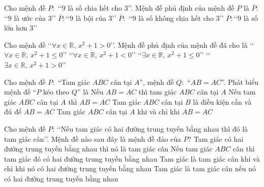 \begin{ex}%
	Cho mệnh đề $P\colon$ \lq\lq   $9$ là số chia hết cho $3$\rq\rq. Mệnh đề phủ định của mệnh đề $P$ là
	\choice
	{$\overline{P}\colon$\lq\lq   $9$ là ước của $3$\rq\rq}
	{$\overline{P}\colon$\lq\lq   $9$ là bội của $3$\rq\rq}
	{\True $\overline{P}\colon$ \lq\lq   $9$ là số không chia hết cho $3$\rq\rq}
	{$\overline{P}\colon$\lq\lq   $9$ là số lớn hơn $3$\rq\rq}
\end{ex}
\begin{ex}%
	Cho mệnh đề \lq\lq $\forall x\in \mathbb{R},\, x^2+1>0$\rq \rq. Mệnh đề phủ định của mệnh đề đã cho là
	\choice
	{\lq\lq $\forall x\in \mathbb{R},\, x^2+1\leq 0$\rq \rq}
	{\lq\lq $\forall x\in \mathbb{R},\, x^2+1<0$\rq \rq}
	{\True \lq\lq $\exists x\in \mathbb{R},\, x^2+1\leq 0$\rq \rq}
	{\lq\lq $\exists x\in \mathbb{R},\, x^2+1>0$\rq \rq}
\end{ex}
\begin{ex}%
	Cho mệnh đề $P\colon$ ``Tam giác $ABC$ cân tại $A$'', mệnh đề $Q\colon$ ``$AB=AC$''. Phát biểu mệnh đề ``$P$ kéo theo $Q$'' là
	\choice
	{Nếu $AB=AC$ thì tam giác $ABC$ cân tại $A$}
	{\True Nếu tam giác $ABC$ cân tại $A$ thì $AB=AC$}
	{Tam giác $ABC$ cân tại $B$ là điều kiện cần và đủ để $AB=AC$}
	{Tam giác $ABC$ cân tại $A$ khi và chỉ khi $AB=AC$}
\end{ex}
\begin{ex}%
	Cho mệnh đề $P$: \lq\lq  Nếu tam giác có hai đường trung tuyến bằng nhau thì đó là tam giác cân\rq\rq. Mệnh đề nào sau đây là mệnh đề đảo của $P$?
	\choice
	{Tam giác có hai đường trung tuyến bằng nhau thì nó là tam giác cân}
	{\True Nếu tam giác $ABC$ cân thì tam giác đó có hai đường trung tuyến bằng nhau }
	{Tam giác là tam giác cân khi và chỉ khi nó có hai đường trung tuyến bằng nhau}
	{Tam giác là tam giác cân nếu nó có hai đường trung tuyến bằng nhau}
\end{ex}
